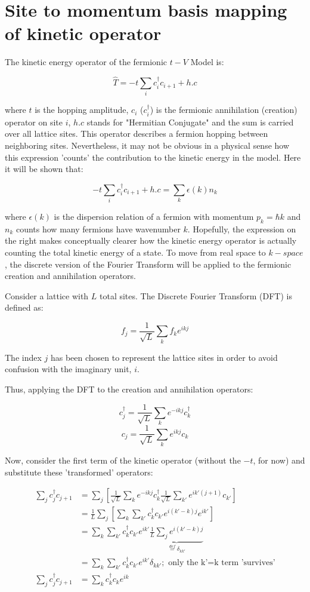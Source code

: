 \section{Site to momentum basis mapping of kinetic operator}
\label{appendix:kineticMapping}

The kinetic energy operator of the fermionic $t-V$ Model is:

\[\hat{T} = -t \sum_{i} c_{i}^{\dagger} c_{i+1} + h.c\]

where $t$ is the hopping amplitude, $c_{i}$ ($c_{i}^{\dagger}$) is the fermionic annihilation (creation) operator on site $i$, $h.c$ stands for "Hermitian Conjugate" and the sum is carried over all lattice sites. This operator describes a fermion hopping between neighboring sites. Nevertheless, it may not be obvious in a physical sense how this expression 'counts' the contribution to the kinetic energy in the model. Here it will be shown that:

\[-t \sum_{i} c_{i}^{\dagger} c_{i+1} + h.c = \sum_{k} \epsilon(k) n_{k} \]

where $\epsilon(k)$ is the dispersion relation of a fermion with momentum $p_{k} = \hbar k$ and $n_{k}$ counts how many fermions have wavenumber $k$. Hopefully, the expression on the right makes conceptually clearer how the kinetic energy operator is actually counting the total kinetic energy of a state. To move from real space to $k-space$, the discrete version of the Fourier Transform will be applied to the fermionic creation and annihilation operators. 

Consider a lattice with $L$ total sites. The Discrete Fourier Transform (DFT) is defined as:

\[ f_{j} = \frac{1}{\sqrt{L}} \sum_{k} f_{k} e^{ikj} \]

The index $j$ has been chosen to represent the lattice sites in order to avoid confusion with the imaginary unit, $i$.

Thus, applying the DFT to the creation and annihilation operators:

\[ c_{j}^{\dagger} = \frac{1}{\sqrt{L}} \sum_{k} e^{-ikj} c_{k}^{\dagger} \] 
\[c_{j} = \frac{1}{\sqrt{L}} \sum_{k} e^{ikj} c_{k}\]

Now, consider the first term of the kinetic operator (without the $-t$, for now) and substitute these 'transformed' operators:

\[ \begin{aligned}
\sum_{j} c_{j}^{\dagger} c_{j+1} &= \sum_{j} [\frac{1}{\sqrt{L}} \sum_{k} e^{-ikj} c_{k}^{\dagger} \frac{1}{\sqrt{L}} \sum_{k'} e^{ik'(j+1)} c_{k'} ] \\
&= \frac{1}{L} \sum_{j} [\sum_{k} \sum_{k'}  c_{k}^{\dagger} c_{k'} e^{i(k'-k)j} e^{ik'}] \\
&= \sum_{k} \sum_{k'}  c_{k}^{\dagger} c_{k'} e^{ik'} \underbrace{\frac{1}{L} \sum_{j} e^{i(k'-k)j}}_{\stackrel{def}{=} \delta_{kk'}} \\
&= \sum_{k} \sum_{k'}  c_{k}^{\dagger} c_{k'} e^{ik'} \delta_{kk'} ; \text{ only the k'=k term 'survives'} \\
\sum_{j} c_{j}^{\dagger} c_{j+1} &= \sum_{k} c_{k}^{\dagger} c_{k} e^{ik} \\
\end{aligned} \]

